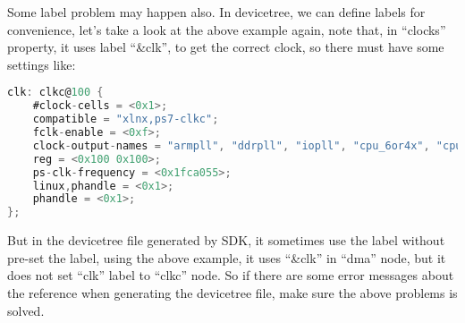 Some label problem may happen also. In devicetree, we can define labels for convenience, let's take a look at the above example again, note that, in ``clocks'' property, it uses label ``\&clk'', to get the correct clock, so there must have some settings like:

{\renewcommand\baselinestretch{0.8}\selectfont
\begin{lstlisting}[frame=single,language=C]
clk: clkc@100 {
	#clock-cells = <0x1>;
	compatible = "xlnx,ps7-clkc";
	fclk-enable = <0xf>;
	clock-output-names = "armpll", "ddrpll", "iopll", "cpu_6or4x", "cpu_3or2x", "cpu_2x", "cpu_1x", "ddr2x", "ddr3x", "dci", "lqspi", "smc", "pcap", "gem0", "gem1", "fclk0", "fclk1", "fclk2", "fclk3", "can0", "can1", "sdio0", "sdio1", "uart0", "uart1", "spi0", "spi1", "dma", "usb0_aper", "usb1_aper", "gem0_aper", "gem1_aper", "sdio0_aper", "sdio1_aper", "spi0_aper", "spi1_aper", "can0_aper", "can1_aper", "i2c0_aper", "i2c1_aper", "uart0_aper", "uart1_aper", "gpio_aper", "lqspi_aper", "smc_aper", "swdt", "dbg_trc", "dbg_apb";
	reg = <0x100 0x100>;
	ps-clk-frequency = <0x1fca055>;
	linux,phandle = <0x1>;
	phandle = <0x1>;
};
\end{lstlisting}
\par}

But in the devicetree file generated by SDK, it sometimes use the label without pre-set the label, using the above example, it uses ``\&clk'' in ``dma'' node, but it does not set ``clk'' label to ``clkc'' node. So if there are some error messages about the reference when generating the devicetree file, make sure the above problems is solved.




